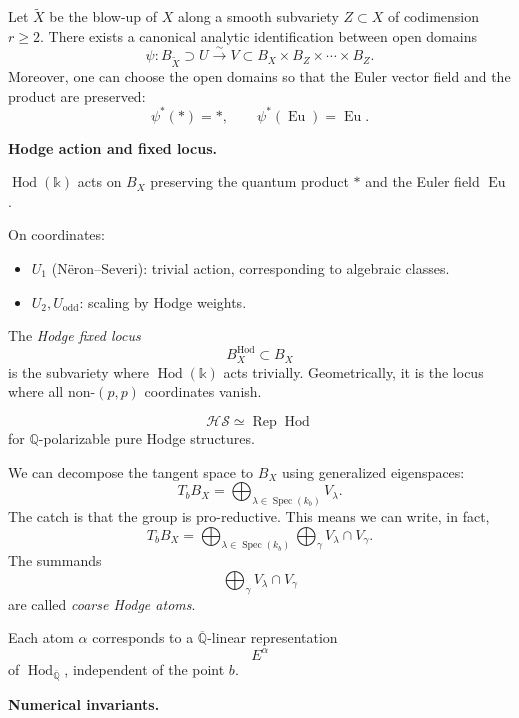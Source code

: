 \begin{theorem}[Iritani, 2003]
\label{theorem-let-x3}
Let $\widetilde X$ be the blow-up
of $X$ along a smooth subvariety
$Z\subset X$ of codimension
$r\geq 2$.
There exists a canonical analytic
identification between open
domains
$$
\psi:
B_{\widetilde X}\supset U
\xrightarrow{\sim}
V\subset
B_X\times B_Z\times\cdots\times B_Z.
$$
Moreover, one can choose the open
domains so that the Euler vector
field and the product are
preserved:
$$
\psi^*(*)=*,
\qquad
\psi^*(\operatorname{Eu})
=\operatorname{Eu}.
$$
\end{theorem}

\medskip\noindent
{\bf Hodge action and fixed locus.}

$\operatorname{Hod}(\mathbb{k})$
acts on $B_X$ preserving the quantum
product $*$ and the Euler field
$\operatorname{Eu}$.

On coordinates:
\begin{itemize}
\item $U_1$ (N\"eron--Severi):
trivial action, corresponding to
algebraic classes.
\item $U_2, U_{\mathrm{odd}}$:
scaling by Hodge weights.
\end{itemize}

\begin{definition}
\label{definition-hodge-fixed}
The {\it Hodge fixed locus}
$$
B_X^{\operatorname{Hod}}\subset B_X
$$
is the subvariety where
$\operatorname{Hod}(\mathbb{k})$
acts trivially.
Geometrically, it is the locus
where all non-$(p,p)$ coordinates
vanish.
\end{definition}

$$
\mathcal{HS}\simeq\operatorname{Rep}
\operatorname{Hod}
$$
for $\mathbb{Q}$-polarizable pure
Hodge structures.

We can decompose the tangent space
to $B_X$ using generalized
eigenspaces:
$$
T_bB_X=
\bigoplus_{\lambda\in\operatorname{Spec}
(k_b)}V_\lambda.
$$
The catch is that the group is
pro-reductive.
This means we can write, in fact,
$$
T_bB_X=
\bigoplus_{\lambda\in\operatorname{Spec}
(k_b)}
\bigoplus_{\gamma}
V_\lambda\cap V_\gamma.
$$
The summands
$$
\bigoplus_{\gamma}
V_\lambda\cap V_\gamma
$$
are called {\it coarse Hodge atoms}.

Each atom $\alpha$ corresponds to a
$\overline{\mathbb{Q}}$-linear
representation
$$
E^\alpha
$$
of
$\operatorname{Hod}_{\overline{\mathbb{Q}}}$,
independent of the point $b$.

\medskip\noindent
{\bf Numerical invariants.}

